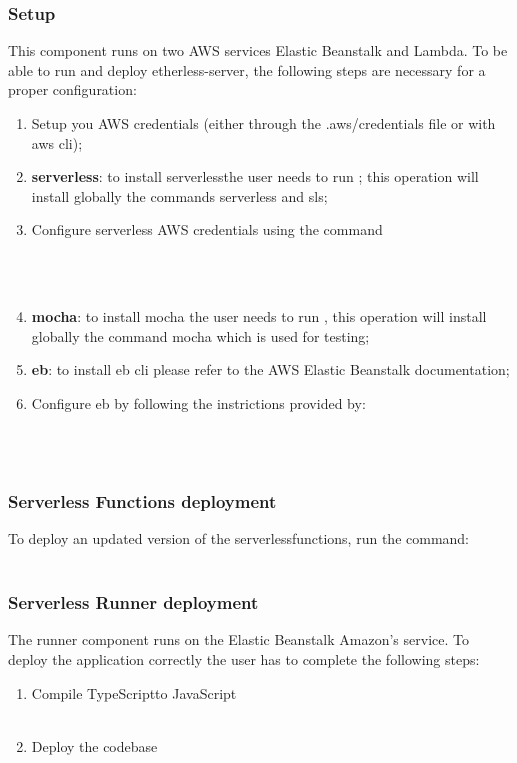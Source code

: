\subsubsection{Setup}
This component runs on two AWS services Elastic Beanstalk and Lambda.
To be able to run and deploy etherless-server, the following steps are necessary for a proper configuration:
\begin{enumerate}
	\item Setup you AWS credentials (either through the .aws/credentials file or with aws cli);
	\item \textbf{serverless}: to install serverless\glo the user needs to run ; this operation will install globally the commands serverless and sls;
	\item Configure serverless AWS credentials using the command\\\\\centerline{}\\
    \item \textbf{mocha}: to install mocha the user needs to run , this operation will install globally the command mocha which is used for testing;
    \item \textbf{eb}: to install eb cli please refer to the AWS Elastic Beanstalk documentation;
    \item Configure eb by following the instrictions provided by: \\\\\centerline{}\\

\end{enumerate}
\subsubsection{Serverless Functions deployment}
To deploy an updated version of the serverless\glo functions, run the command:
\\\\ \centerline{}
\subsubsection{Serverless Runner deployment}
The runner component runs on the Elastic Beanstalk Amazon's service. To deploy the application correctly the user has to complete the following steps:
\begin{enumerate}
	\item Compile TypeScript\glo to JavaScript\glo \\\\ \centerline{}
	\item Deploy the codebase \\\\ \centerline{}
\end{enumerate}
